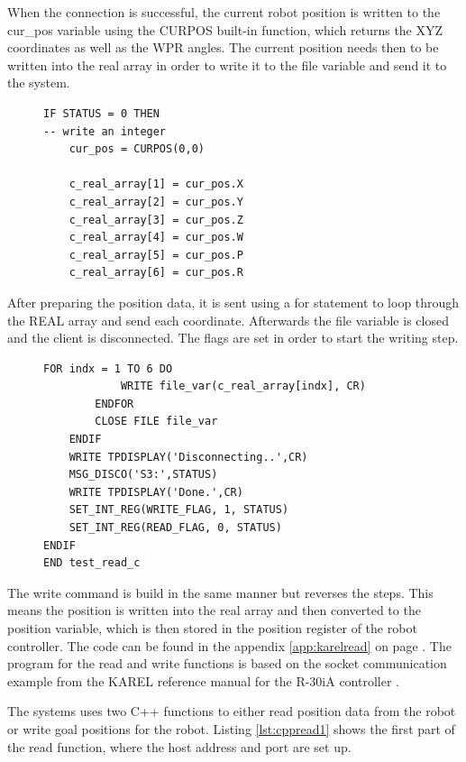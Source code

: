 When the connection is successful, the current robot position is written to the cur\_pos variable using the CURPOS built-in function, which returns the XYZ coordinates as well as the WPR angles. The current position needs then to be written into the real array in order to write it to the file variable and send it to the system. 
\begin{figure}[H]
\begin{lstlisting}[frame = single, caption={KAREL read current robot position and prepare the data for sending.}, captionpos=b, label={lst:karelvarprep}]
 IF STATUS = 0 THEN
-- write an integer
	cur_pos = CURPOS(0,0)
	
	c_real_array[1] = cur_pos.X
	c_real_array[2] = cur_pos.Y
	c_real_array[3] = cur_pos.Z
	c_real_array[4] = cur_pos.W
	c_real_array[5] = cur_pos.P
	c_real_array[6] = cur_pos.R
\end{lstlisting}
\end{figure}
After preparing the position data, it is sent using a for statement to loop through the REAL array and send each coordinate. Afterwards the file variable is closed and the client is disconnected. The flags are set in order to start the writing step.
\begin{figure}[H]
\begin{lstlisting}[frame = single, caption={KAREL sending position data and closing connection.}, captionpos=b, label={lst:karelread}]
		FOR indx = 1 TO 6 DO
			WRITE file_var(c_real_array[indx], CR)
		ENDFOR
		CLOSE FILE file_var
	ENDIF
	WRITE TPDISPLAY('Disconnecting..',CR)
	MSG_DISCO('S3:',STATUS)
	WRITE TPDISPLAY('Done.',CR)
	SET_INT_REG(WRITE_FLAG, 1, STATUS)
	SET_INT_REG(READ_FLAG, 0, STATUS)
ENDIF
END test_read_c
\end{lstlisting}
\end{figure}
The write command is build in the same manner but reverses the steps. This means the position is written into the real array and then converted to the position variable, which is then stored in the position register of the robot controller. The code can be found in the appendix \ref{app:karelread} on page \pageref{app:karelread}. The program for the read and write functions is based on the socket communication example from the KAREL reference manual for the R-30iA controller \cite{refman}.

The systems uses two C++ functions to either read position data from the robot or write goal positions for the robot. Listing \ref{lst:cppread1} shows the first part of the read function, where the host address and port are set up.

